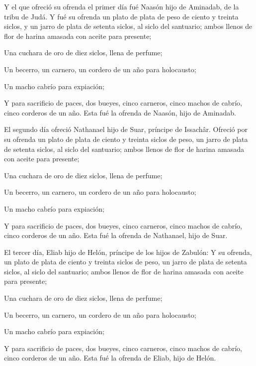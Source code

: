  Y el que ofreció su ofrenda el primer día fué Naasón
hijo de Aminadab, de la tribu de Judá.  Y fué su ofrenda
un plato de plata de peso de ciento y treinta siclos, y un jarro de
plata de setenta siclos, al siclo del santuario; ambos llenos de flor de
harina amasada con aceite para presente;

 Una cuchara de oro de diez siclos, llena de perfume;

 Un becerro, un carnero, un cordero de un año para
holocausto;

 Un macho cabrío para expiación;

 Y para sacrificio de paces, dos bueyes, cinco carneros,
cinco machos de cabrío, cinco corderos de un año. Esta fué la ofrenda de
Naasón, hijo de Aminadab.

 El segundo día ofreció Nathanael hijo de Suar, príncipe
de Issachâr.  Ofreció por su ofrenda un plato de plata de
ciento y treinta siclos de peso, un jarro de plata de setenta siclos, al
siclo del santuario; ambos llenos de flor de harina amasada con aceite
para presente;

 Una cuchara de oro de diez siclos, llena de perfume;

 Un becerro, un carnero, un cordero de un año para
holocausto;

 Un macho cabrío para expiación;

 Y para sacrificio de paces, dos bueyes, cinco carneros,
cinco machos de cabrío, cinco corderos de un año. Esta fué la ofrenda de
Nathanael, hijo de Suar.

 El tercer día, Eliab hijo de Helón, príncipe de los
hijos de Zabulón:  Y su ofrenda, un plato de plata de
ciento y treinta siclos de peso, un jarro de plata de setenta siclos, al
siclo del santuario; ambos llenos de flor de harina amasada con aceite
para presente;

 Una cuchara de oro de diez siclos, llena de perfume;

 Un becerro, un carnero, un cordero de un año para
holocausto;

 Un macho cabrío para expiación;

 Y para sacrificio de paces, dos bueyes, cinco carneros,
cinco machos de cabrío, cinco corderos de un año. Esta fué la ofrenda de
Eliab, hijo de Helón.

